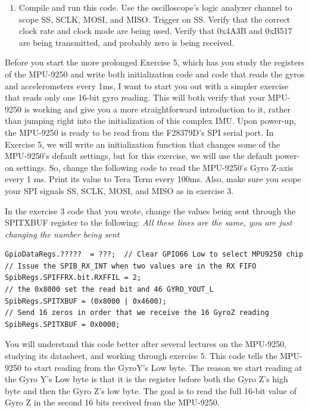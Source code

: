 \documentclass[11pt]{article}
\begin{document}
\begin{enumerate}
\begin{verbatim}
    // Set GPIO 66 high to end Slave Select. Now
    // to Scope. Later, deselect the MPU9250.
    GpioDataRegs.???? = ???;
    // Later, when actually communicating with the MPU9250,
    // do something with the data. Now do nothing.

    // Clear Overflow flag just in case of an overflow
    SpibRegs.SPIFFRX.bit.RXFFOVFCLR = 1;
    // Clear RX FIFO Interrupt flag so next interrupt will happen
    SpibRegs.SPIFFRX.bit.RXFFINTCLR = 1;

    // Acknowledge INT6 PIE interrupt
    PieCtrlRegs.PIEACK.all = PIEACK_GROUP6;
}
\end{verbatim}
    \item Compile and run this code. Use the oscilloscope's logic analyzer channel to scope SS, SCLK, MOSI, and MISO. Trigger on SS. Verify that the correct clock rate and clock mode are being used. Verify that 0x4A3B and 0xB517 are being transmitted, and probably zero is being received.
\end{enumerate}
%

Before you start the more prolonged Exercise 5, which has you study the registers of the MPU-9250 and write both initialization code and code that reads the gyros and accelerometers every 1ms, I want to start you out with a simpler exercise that reads only one 16-bit gyro reading. This will both verify that your MPU-9250 is working and give you a more straightforward introduction to it, rather than jumping right into the initialization of this complex IMU. Upon power-up, the MPU-9250 is ready to be read from the F28379D’s SPI serial port. In Exercise 5, we will write an initialization function that changes some of the MPU-9250's default settings, but for this exercise, we will use the default power-on settings. So, change the following code to read the MPU-9250’s Gyro Z-axis every 1 ms. Print its value to Tera Term every 100ms. Also, make sure you scope your SPI signals SS, SCLK, MOSI, and MISO as in exercise 3.

In the exercise 3 code that you wrote, change the values being sent through the SPITXBUF register to the following:  \textit{All these lines are the same, you are just changing the number being sent}
%
\begin{verbatim}
GpioDataRegs.?????  = ???;  // Clear GPIO66 Low to select MPU9250 chip
// Issue the SPIB_RX_INT when two values are in the RX FIFO
SpibRegs.SPIFFRX.bit.RXFFIL = 2;
// the 0x8000 set the read bit and 46 GYRO_YOUT_L
SpibRegs.SPITXBUF = (0x8000 | 0x4600);
// Send 16 zeros in order that we receive the 16 GyroZ reading
SpibRegs.SPITXBUF = 0x0000;
\end{verbatim}
%
You will understand this code better after several lectures on the MPU-9250, studying its datasheet, and working through exercise 5. This code tells the MPU-9250 to start reading from the GyroY’s Low byte. The reason we start reading at the Gyro Y’s Low byte is that it is the register before both the Gyro Z’s high byte and then the Gyro Z’s low byte. The goal is to read the full 16-bit value of Gyro Z in the second 16 bits received from the MPU-9250.
\end{document}
